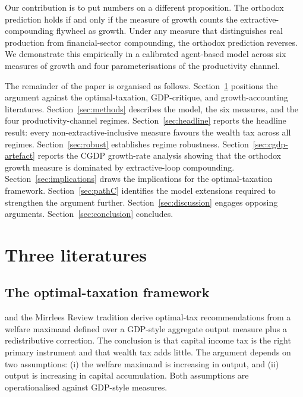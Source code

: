 \documentclass[11pt]{article}
\begin{document}
Our contribution is to put numbers on a different proposition.  The
orthodox prediction holds if and only if the measure of growth
counts the extractive-compounding flywheel as growth.  Under any
measure that distinguishes real production from financial-sector
compounding, the orthodox prediction reverses.  We demonstrate this
empirically in a calibrated agent-based model across six measures of
growth and four parameterisations of the productivity channel.

The remainder of the paper is organised as follows.
Section~\ref{sec:literature} positions the argument against the
optimal-taxation, GDP-critique, and growth-accounting literatures.
Section~\ref{sec:methods} describes the model, the six measures, and
the four productivity-channel regimes.
Section~\ref{sec:headline} reports the headline result: every
non-extractive-inclusive measure favours the wealth tax across all
regimes.  Section~\ref{sec:robust} establishes regime robustness.
Section~\ref{sec:cgdp-artefact} reports the CGDP growth-rate
analysis showing that the orthodox growth measure is dominated by
extractive-loop compounding.  Section~\ref{sec:implications} draws
the implications for the optimal-taxation framework.
Section~\ref{sec:pathC} identifies the model extensions required to
strengthen the argument further.  Section~\ref{sec:discussion}
engages opposing arguments.  Section~\ref{sec:conclusion} concludes.

\section{Three literatures}
\label{sec:literature}

\subsection{The optimal-taxation framework}

\citet{mirrlees2011tax} and the Mirrlees Review tradition derive
optimal-tax recommendations from a welfare maximand defined over a
GDP-style aggregate output measure plus a redistributive correction.
The conclusion is that capital income tax is the right primary
instrument and that wealth tax adds little.  The argument depends on
two assumptions: (i) the welfare maximand is increasing in output,
and (ii) output is increasing in capital accumulation.  Both
assumptions are operationalised against GDP-style measures.
\end{document}
